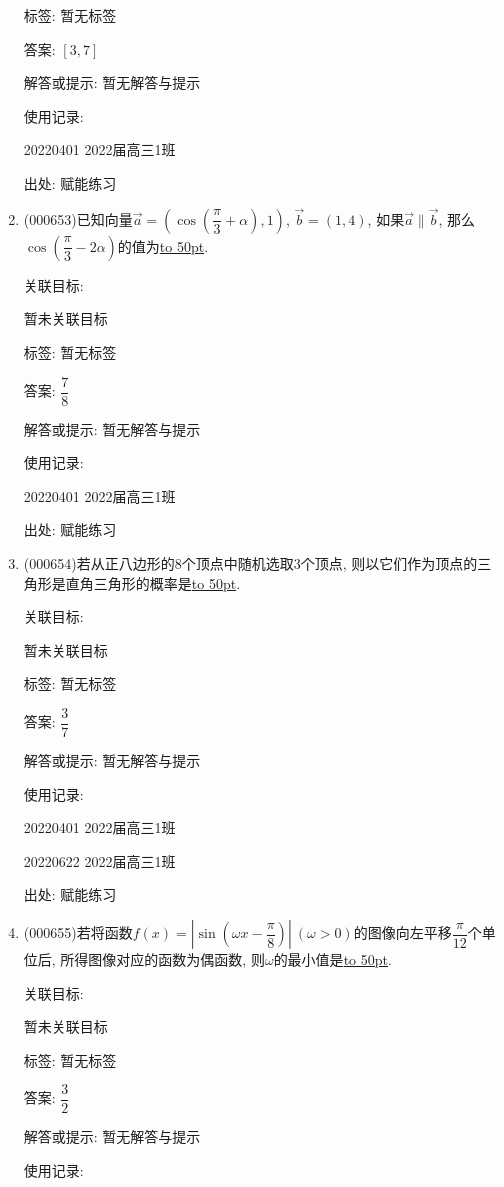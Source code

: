 \documentclass[10pt,a4paper]{article}
\newcommand{\blank}[1]{\underline{\hbox to #1pt{}}}
\begin{document}
\begin{enumerate}[1.]
标签: 暂无标签

答案: $[3,7]$

解答或提示: 暂无解答与提示

使用记录:

20220401	2022届高三1班	


出处: 赋能练习
\item { (000653)}已知向量$\overrightarrow a=(\cos(\dfrac{\pi}3+\alpha),1)$, $\overrightarrow b=(1,4)$, 如果$\overrightarrow a \parallel \overrightarrow b$, 那么$\cos(\dfrac{\pi}3-2\alpha)$的值为\blank{50}.


关联目标:

暂未关联目标



标签: 暂无标签

答案: $\dfrac 78$

解答或提示: 暂无解答与提示

使用记录:

20220401	2022届高三1班	


出处: 赋能练习
\item { (000654)}若从正八边形的$8$个顶点中随机选取$3$个顶点, 则以它们作为顶点的三角形是直角三角形的概率是\blank{50}.


关联目标:

暂未关联目标



标签: 暂无标签

答案: $\dfrac 37$

解答或提示: 暂无解答与提示

使用记录:

20220401	2022届高三1班	

20220622	2022届高三1班  	


出处: 赋能练习
\item { (000655)}若将函数$f(x)=|\sin(\omega x-\dfrac{\pi}8)| \ (\omega >0)$的图像向左平移$\dfrac{\pi}{12}$个单位后, 所得图像对应的函数为偶函数, 则$\omega$的最小值是\blank{50}.


关联目标:

暂未关联目标



标签: 暂无标签

答案: $\dfrac 32$

解答或提示: 暂无解答与提示

使用记录:


\end{enumerate}
\end{document}
